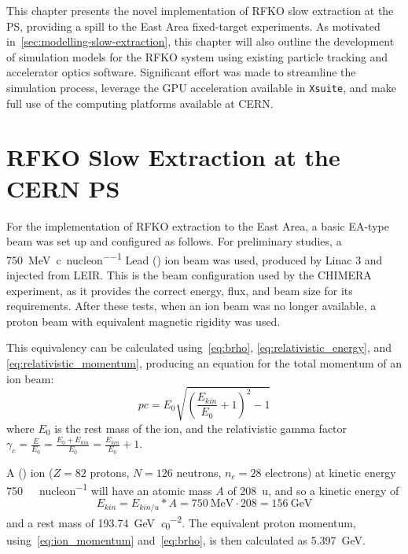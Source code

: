 \documentclass[a4paper,twoside,11pt]{report}
\begin{document}
This chapter presents the novel implementation of RFKO slow extraction at the PS, providing a spill to the East Area fixed-target experiments. As motivated in~\autoref{sec:modelling-slow-extraction}, this chapter will also outline the development of simulation models for the RFKO system using existing particle tracking and accelerator optics software. Significant effort was made to streamline the simulation process, leverage the GPU acceleration available in \verb|Xsuite|, and make full use of the computing platforms available at CERN.

\section{RFKO Slow Extraction at the CERN PS}

For the implementation of RFKO extraction to the East Area, a basic EA-type beam was set up and configured as follows. For preliminary studies, a \qty[per-mode=symbol]{750}{\mega\electronvolt\per~c\per nucleon} Lead () ion beam was used, produced by Linac 3 and injected from LEIR. This is the beam configuration used by the CHIMERA experiment, as it provides the correct energy, flux, and beam size for its requirements. After these tests, when an ion beam was no longer available, a proton beam with equivalent magnetic rigidity was used.

This equivalency can be calculated using~\autoref{eq:brho}, \autoref{eq:relativistic_energy}, and \autoref{eq:relativistic_momentum}, producing an equation for the total momentum of an ion beam:
\begin{equation}
  pc=E_0\sqrt{\left( \frac{E_{kin}}{E_0}+1\right)^2-1}
  \label{eq:ion_momentum}
\end{equation} where $E_0$ is the rest mass of the ion, and the relativistic gamma factor $\gamma_c = \frac{E}{E_0}=\frac{E_0+E_{kin}}{E_0}=\frac{E_{kin}}{E_0}+1$.

A () ion ($Z=82$ protons, $N=126$ neutrons, $n_e=28$ electrons) at kinetic energy \qty[per-mode=symbol]{750}{\mega\eVperc\per nucleon} will have an atomic mass $A$ of \qty{208}{\atomicmassunit}, and so a kinetic energy of 
\begin{equation}
  E_{kin}=E_{kin/u}*A=\qty{750}{\mega\electronvolt}\cdot 208=\qty{156}{\giga\electronvolt}
\end{equation}
and a rest mass of \qty{193.74}{\giga\electronvolt\per\clight\squared}. The equivalent proton momentum, using~\autoref{eq:ion_momentum} and~\autoref{eq:brho}, is then calculated as \qty{5.397}{\giga\electronvolt}. 
\end{document}
